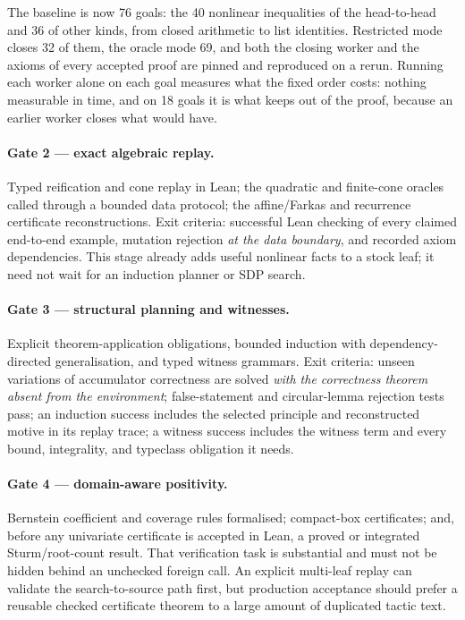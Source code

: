 The baseline is now 76 goals: the 40 nonlinear inequalities of the head-to-head
and 36 of other kinds, from closed arithmetic to list identities. Restricted
mode closes 32 of them, the oracle mode 69, and both the closing worker and the
axioms of every accepted proof are pinned and reproduced on a rerun. Running
each worker alone on each goal measures what the fixed order costs: nothing
measurable in time, and on 18 goals it is what keeps 
out of the proof, because an earlier worker closes what \grind{} would have.

\paragraph{Gate 2 --- exact algebraic replay.}
Typed reification and cone replay in Lean; the quadratic and finite-cone oracles
called through a bounded data protocol; the affine/Farkas and recurrence
certificate reconstructions. Exit criteria: successful Lean checking of every
claimed end-to-end example, mutation rejection \emph{at the data boundary}, and
recorded axiom dependencies. This stage already adds useful nonlinear facts to a
stock \grind{} leaf; it need not wait for an induction planner or SDP search.

\paragraph{Gate 3 --- structural planning and witnesses.}
Explicit theorem-application obligations, bounded induction with
dependency-directed generalisation, and typed witness grammars. Exit criteria:
unseen variations of accumulator correctness are solved \emph{with the
correctness theorem absent from the environment}; false-statement and
circular-lemma rejection tests pass; an induction success includes the selected
principle and reconstructed motive in its replay trace; a witness success
includes the witness term and every bound, integrality, and typeclass obligation
it needs.

\paragraph{Gate 4 --- domain-aware positivity.}
Bernstein coefficient and coverage rules formalised; compact-box certificates;
and, before any univariate certificate is accepted in Lean, a proved or
integrated Sturm/root-count result. That verification task is substantial and
must not be hidden behind an unchecked foreign call. An explicit multi-leaf
replay can validate the search-to-source path first, but production acceptance
should prefer a reusable checked certificate theorem to a large amount of
duplicated tactic text.


